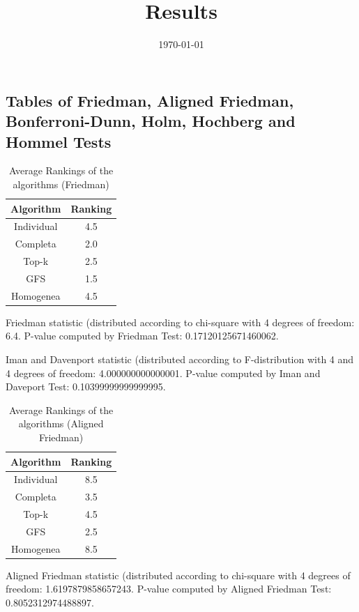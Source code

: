 \documentclass[a4paper,10pt]{article}
\title{Results}
\author{}
\date{\today}
\begin{document}
\begin{landscape}
\oddsidemargin 0in \topmargin 0in\maketitle
\section{Tables of Friedman, Aligned Friedman, Bonferroni-Dunn, Holm, Hochberg and Hommel Tests}
\begin{table}[!htp]
\centering
\caption{Average Rankings of the algorithms (Friedman)
}\begin{tabular}{c|c}
Algorithm&Ranking\\
\hline
Individual&4.5\\
Completa&2.0\\
Top-k&2.5\\
GFS&1.5\\
Homogenea&4.5\\
\end{tabular}
\end{table}


Friedman statistic (distributed according to chi-square with 4 degrees of freedom: 6.4. 
P-value computed by Friedman Test: 0.17120125671460062.\newline

Iman and Davenport statistic (distributed according to F-distribution with 4 and 4 degrees of freedom: 4.000000000000001. 
P-value computed by Iman and Daveport Test: 0.10399999999999995.\newline


\newpage

\begin{table}[!htp]
\centering
\caption{Average Rankings of the algorithms (Aligned Friedman)
}\begin{tabular}{c|c}
Algorithm&Ranking\\
\hline
Individual&8.5\\
Completa&3.5\\
Top-k&4.5\\
GFS&2.5\\
Homogenea&8.5\\
\end{tabular}
\end{table}


Aligned Friedman statistic (distributed according to chi-square with 4 degrees of freedom: 1.6197879858657243. 
P-value computed by Aligned Friedman Test: 0.8052312974488897.\newline



\end{landscape}
\end{document}
